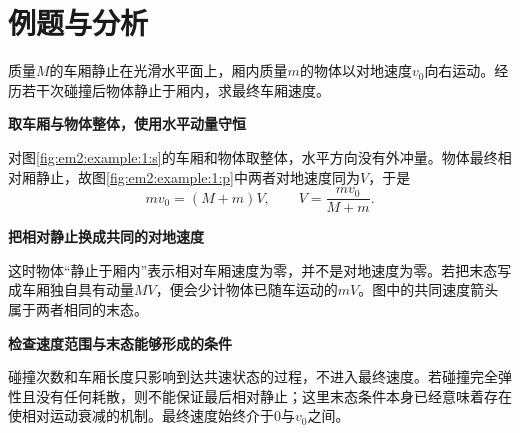 \section{例题与分析}

\begin{question}\begin{example}[车厢内的多次碰撞]\label{em2:example:1}
质量$M$的车厢静止在光滑水平面上，厢内质量$m$的物体以对地速度$v_0$向右运动。经历若干次碰撞后物体静止于厢内，求最终车厢速度。
\end{example}
\end{question}
\begin{solution}\textbf{取车厢与物体整体，使用水平动量守恒}\par\nobreak
对图\ref{fig:em2:example:1:s}的车厢和物体取整体，水平方向没有外冲量。物体最终相对厢静止，故图\ref{fig:em2:example:1:p}中两者对地速度同为$V$，于是
\[mv_0=(M+m)V,\qquad\boxed{V=\frac{mv_0}{M+m}}.\]



\par\medskip{}\noindent\textbf{把相对静止换成共同的对地速度}\par\nobreak
这时物体“静止于厢内”表示相对车厢速度为零，并不是对地速度为零。若把末态写成车厢独自具有动量$MV$，便会少计物体已随车运动的$mV$。图中的共同速度箭头属于两者相同的末态。



\par\medskip{}\noindent\textbf{检查速度范围与末态能够形成的条件}\par\nobreak
碰撞次数和车厢长度只影响到达共速状态的过程，不进入最终速度。若碰撞完全弹性且没有任何耗散，则不能保证最后相对静止；这里末态条件本身已经意味着存在使相对运动衰减的机制。最终速度始终介于$0$与$v_0$之间。\end{solution}
